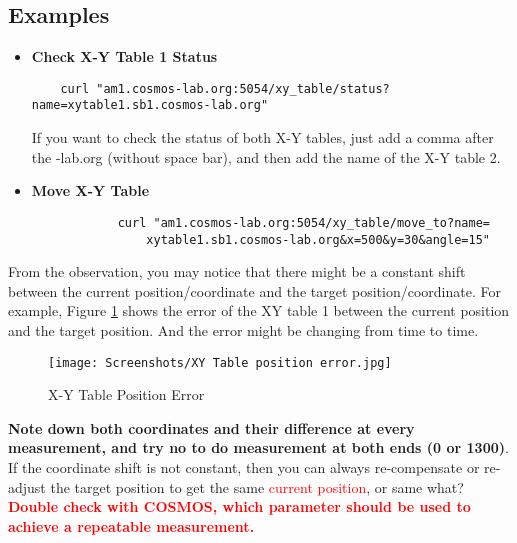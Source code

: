 \documentclass{article}
\begin{document}
            
            
    \subsection{Examples}
        \begin{itemize}
            \item \textbf{Check X-Y Table 1 Status} 
                \begin{verbatim}
    curl "am1.cosmos-lab.org:5054/xy_table/status?name=xytable1.sb1.cosmos-lab.org"
                \end{verbatim}
                    
                If you want to check the status of both X-Y tables, just add a comma after the -lab.org (without space bar), and then add the name of the X-Y table 2. 
            
            \item \textbf{Move X-Y Table} 
            \begin{verbatim}
            curl "am1.cosmos-lab.org:5054/xy_table/move_to?name=
                xytable1.sb1.cosmos-lab.org&x=500&y=30&angle=15"
            \end{verbatim}   
        \end{itemize}
        
        From the observation, you may notice that there might be a constant shift between the current position/coordinate and the target position/coordinate. For example, Figure \ref{fig: X-Y Table Position Error} shows the error of the XY table 1 between the current position and the target position. And the error might be changing from time to time. 
        \begin{figure}[ht]
            \centering
            \texttt{[image: Screenshots/XY Table position error.jpg]}
            \caption{X-Y Table Position Error}
            \vspace*{0mm}
            \label{fig: X-Y Table Position Error}
        \end{figure}
        
        \textbf{Note down both coordinates and their difference at every measurement, and try no to do measurement at both ends (0 or 1300)}. If the coordinate shift is not constant, then you can always re-compensate or re-adjust the target position to get the same \textcolor{red}{current position}, or same what? \textbf{\textcolor{red}{Double check with COSMOS, which parameter should be used to achieve a repeatable measurement. }}
            
\end{document}
